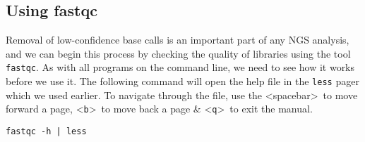 
\chapter{\moduleTitle}
\newpage

\section{Using fastqc}
\begin{steps}
Removal of low-confidence base calls is an important part of any NGS analysis, and we can begin this process by checking the quality of libraries using the tool \texttt{fastqc}.
As with all programs on the command line, we need to see how it works before we use it.
The following command will open the help file in the \texttt{less} pager which we used earlier.
To navigate through the file, use the \textless spacebar\textgreater ~to move forward a page, \textless \texttt{b}\textgreater ~to move back a page \& \textless \texttt{q}\textgreater ~to exit the manual. \\
\begin{lstlisting}
fastqc -h | less
\end{lstlisting}
\end{steps}

